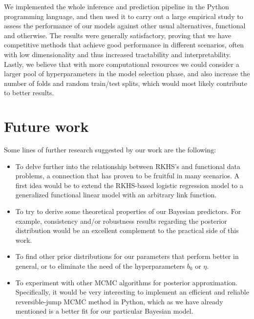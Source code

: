 We implemented the whole inference and prediction pipeline in the Python programming language, and then used it to carry out a large empirical study to assess the performance of our models against other usual alternatives, functional and otherwise. The results were generally satisfactory, proving that we have competitive methods that achieve good performance in different scenarios, often with low dimensionality and thus increased tractability and interpretability. Lastly, we believe that with more computational resources we could consider a larger pool of hyperparameters in the model selection phase, and also increase the number of folds and random train/test splits, which would most likely contribute to better results.

\section{Future work}

Some lines of further research suggested by our work are the following:

\begin{itemize}
  \item To delve further into the relationship between RKHS's and functional data problems, a connection that has proven to be fruitful in many scenarios. A first idea would be to extend the RKHS-based logistic regression model to a generalized functional linear model with an arbitrary link function.
  \item To try to derive some theoretical properties of our Bayesian predictors. For example, consistency and/or robustness results regarding the posterior distribution would be an excellent complement to the practical side of this work.
  \item To find other prior distributions for our parameters that perform better in general, or to eliminate the need of the hyperparameters \(b_0\) or \(\eta\).
  \item To experiment with other MCMC algorithms for posterior approximation. Specifically, it would be very interesting to implement an efficient and reliable reversible-jump MCMC method in Python, which as we have already mentioned is a better fit for our particular Bayesian model.
\end{itemize}

